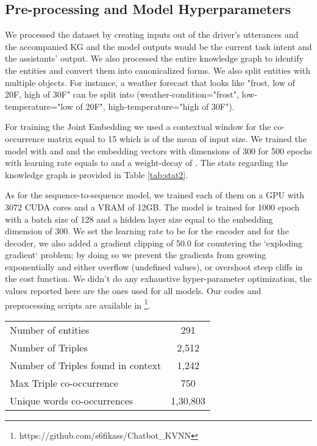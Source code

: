 \documentclass[runningheads]{llncs}
\begin{document}
\subsection{Pre-processing and Model Hyperparameters}
We processed the dataset by creating inputs out of the driver's utterances and the accompanied KG and the model outputs would be the current task intent and the assistants' output. We also processed the entire knowledge graph to identify the entities and convert them into canonicalized forms. We also split entities with multiple objects. For instance, a weather forecast that looks like "frost, low of 20F, high of 30F" can be split into (weather-condition="frost", low-temperature="low of 20F", high-temperature="high of 30F"). 

For training the Joint Embedding we used a contextual window for the co-occurrence matrix equal to 15 which is  of the mean of input size. We trained the model with   and  and the embedding vectors with dimensions of 300 for 500 epochs with learning rate equals to  and a weight-decay of . The stats regarding the knowledge graph is provided in Table \ref{tab:stat2}.

As for the sequence-to-sequence model, we trained each of them on a GPU with 3072 CUDA cores and a VRAM of 12GB. The model is trained for 1000 epoch with a batch size of 128 and a hidden layer size equal to the embedding dimension of 300. We set the learning rate to be  for the encoder and  for the decoder, we also added a gradient clipping of 50.0 for countering the `exploding gradient` problem; by doing so we prevent the gradients from growing exponentially and either overflow (undefined values), or overshoot steep cliffs in the cost function. We didn't do any exhaustive hyper-parameter optimization, the values reported here are the ones used for all models. Our codes and preprocessing scripts are available in \footnote{https://github.com/s6fikass/Chatbot\_KVNN}.



\begin{table*}[ht]
    \centering  
    \caption{Statistics of the trained Joint Embedding.}
     \begin{tabular}{ l | c}
     \toprule
     Number of entities & 291 \\
     Number of Triples & 2,512\\
     Number of Triples found in context & 1,242\\
     Max Triple co-occurrence  &	750\\
     Unique words co-occurrences	& 1,30,803 \\
     \bottomrule
    
    \end{tabular}
       \vspace{0.1cm}
     
    
    \label{tab:stat2}
\end{table*}
\end{document}
